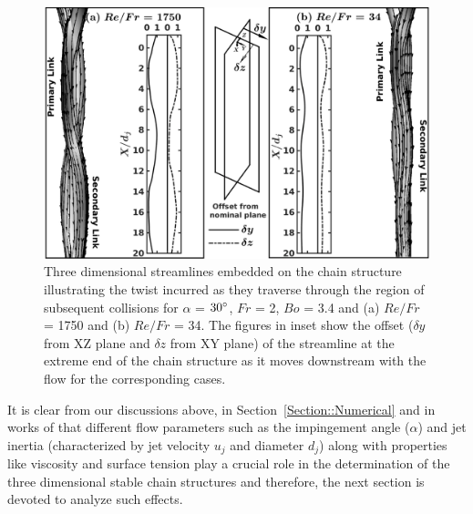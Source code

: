 \documentclass[%
aip,
sd,%
amsmath,amssymb,
preprint,%
author-year,%
]{revtex4-1}
\begin{document}
\begin{figure}
	\centering
	\includegraphics[width=\linewidth]{fig1}
	\caption{Three dimensional streamlines embedded on the chain structure illustrating the twist incurred as they traverse through the region of subsequent collisions for $\alpha$ = $30\degree$, $Fr$ = 2, $Bo$ = 3.4 and (a) $Re/Fr$ = 1750 and (b) $Re/Fr$ = 34. The figures in inset show the offset ($\delta y$ from XZ plane and $\delta z$ from XY plane) of the streamline at the extreme end of the chain structure as it moves downstream with the flow for the corresponding cases.}
	\label{Figure::stream}
\end{figure}
It is clear from our discussions above, in Section~\ref{Section::Numerical} and in works of \cite{yang2014liquid} that different flow parameters such as the impingement angle ($\alpha$) and jet inertia (characterized by jet velocity $u_j$ and diameter $d_j$) along with properties like viscosity and surface tension play a crucial role in the determination of the three dimensional stable chain structures and therefore, the next section is devoted to analyze such effects.
\end{document}
